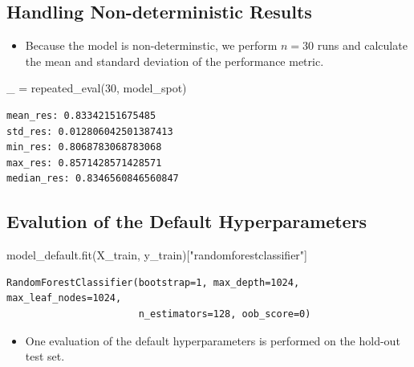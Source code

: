 \documentclass[
  letterpaper,
  DIV=11,
  numbers=noendperiod]{scrreprt}
\newenvironment{Shaded}{\begin{snugshade}}{\end{snugshade}}
\newcommand{\DecValTok}[1]{\textcolor[rgb]{0.68,0.00,0.00}{#1}}
\newcommand{\NormalTok}[1]{\textcolor[rgb]{0.00,0.23,0.31}{#1}}
\newcommand{\OperatorTok}[1]{\textcolor[rgb]{0.37,0.37,0.37}{#1}}
\newcommand{\StringTok}[1]{\textcolor[rgb]{0.13,0.47,0.30}{#1}}
\providecommand{\tightlist}{%
  \setlength{\itemsep}{0pt}\setlength{\parskip}{0pt}}\usepackage{longtable,booktabs,array}
\begin{document}
\hypertarget{handling-non-deterministic-results}{%
\subsection{Handling Non-deterministic
Results}\label{handling-non-deterministic-results}}

\begin{itemize}
\tightlist
\item
  Because the model is non-determinstic, we perform \(n=30\) runs and
  calculate the mean and standard deviation of the performance metric.
\end{itemize}

\begin{Shaded}
\begin{Highlighting}[]
\NormalTok{\_ }\OperatorTok{=}\NormalTok{ repeated\_eval(}\DecValTok{30}\NormalTok{, model\_spot)}
\end{Highlighting}
\end{Shaded}

\begin{verbatim}
mean_res: 0.83342151675485
std_res: 0.012806042501387413
min_res: 0.8068783068783068
max_res: 0.8571428571428571
median_res: 0.8346560846560847
\end{verbatim}

\hypertarget{evalution-of-the-default-hyperparameters}{%
\subsection{Evalution of the Default
Hyperparameters}\label{evalution-of-the-default-hyperparameters}}

\begin{Shaded}
\begin{Highlighting}[]
\NormalTok{model\_default.fit(X\_train, y\_train)[}\StringTok{"randomforestclassifier"}\NormalTok{]}
\end{Highlighting}
\end{Shaded}

\begin{verbatim}
RandomForestClassifier(bootstrap=1, max_depth=1024, max_leaf_nodes=1024,
                       n_estimators=128, oob_score=0)
\end{verbatim}

\begin{itemize}
\tightlist
\item
  One evaluation of the default hyperparameters is performed on the
  hold-out test set.
\end{itemize}
\end{document}
